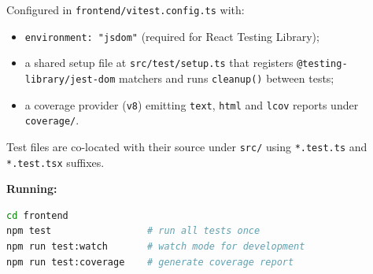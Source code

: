 \documentclass[11pt,a4paper]{article}
\begin{document}
Configured in \texttt{frontend/vitest.config.ts} with:
\begin{itemize}[leftmargin=1.6em]
  \item \texttt{environment: "jsdom"} (required for React Testing Library);
  \item a shared setup file at \texttt{src/test/setup.ts} that registers
        \texttt{@testing-library/jest-dom} matchers and runs
        \texttt{cleanup()} between tests;
  \item a coverage provider (\texttt{v8}) emitting \texttt{text}, \texttt{html}
        and \texttt{lcov} reports under \texttt{coverage/}.
\end{itemize}

Test files are co-located with their source under \texttt{src/} using
\texttt{*.test.ts} and \texttt{*.test.tsx} suffixes.

\textbf{Running:}
\begin{lstlisting}[language=bash]
cd frontend
npm test                 # run all tests once
npm run test:watch       # watch mode for development
npm run test:coverage    # generate coverage report
\end{lstlisting}
\end{document}
